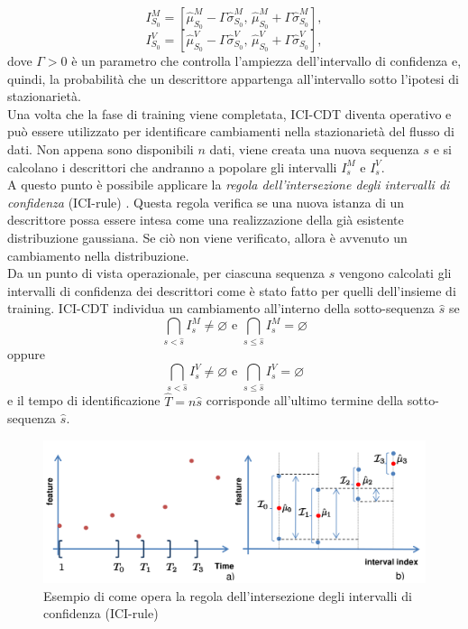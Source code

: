 \[I_{S_0}^M= \left[\hat{\mu}^M_{S_0}-\Gamma \hat{\sigma}^M_{S_0} \text{, } \hat{\mu}^M_{S_0}+\Gamma \hat{\sigma}^M_{S_0}\right], \]
\[I_{S_0}^V= \left[\hat{\mu}^V_{S_0}-\Gamma \hat{\sigma}^V_{S_0} \text{, } \hat{\mu}^V_{S_0}+\Gamma \hat{\sigma}^V_{S_0}\right], \]
dove $\Gamma>0$ \`e un parametro che controlla l'ampiezza dell'intervallo di confidenza e, quindi, la probabilit\`a che un descrittore appartenga all'intervallo sotto l'ipotesi di stazionariet\`a. \\
Una volta che la fase di training viene completata, ICI-CDT diventa operativo e pu\`o essere utilizzato per identificare cambiamenti nella stazionariet\`a del flusso di dati. Non appena sono disponibili $n$ dati, viene creata una nuova sequenza $s$ e si calcolano i descrittori che andranno a popolare gli intervalli $I_{s}^{M}$ e $I_{s}^{V}$.\\
A questo punto \`e possibile applicare la \textit{regola dell'intersezione degli intervalli di confidenza} (ICI-rule) \cite{goldenshluger1997spatially}. Questa regola verifica se una nuova istanza di un descrittore possa essere intesa come una realizzazione della gi\`a esistente distribuzione gaussiana. Se ci\`o non viene verificato, allora \`e avvenuto un cambiamento nella distribuzione.\\
Da un punto di vista operazionale, per ciascuna sequenza $s$ vengono calcolati gli intervalli di confidenza dei descrittori come \`e stato fatto per quelli dell'insieme di training. ICI-CDT individua un cambiamento all'interno della sotto-sequenza $\hat{s}$ se
\[\bigcap_{s<\hat{s}}I_s^M \neq \varnothing \text{ e } \bigcap_{s\leq\hat{s}}I_s^M = \varnothing \]
oppure
\[\bigcap_{s<\hat{s}}I_s^V \neq \varnothing \text{ e } \bigcap_{s\leq\hat{s}}I_s^V = \varnothing \]
e il tempo di identificazione $\hat{T}=n\hat{s}$ corrisponde all'ultimo termine della sotto-sequenza $\hat{s}$.\\
\begin{figure}
	\centering
	\includegraphics[width=12cm,keepaspectratio]{pictures/ICIrule}
	\caption{Esempio di come opera la regola dell'intersezione degli intervalli di confidenza (ICI-rule)}
	\label{fig:ICIrule}
\end{figure}
